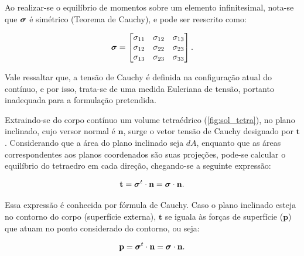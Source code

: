 Ao realizar-se o equilíbrio de momentos sobre um elemento infinitesimal, nota-se que $\bm{\sigma}$ é simétrico (Teorema de Cauchy), e pode ser reescrito como:

\begin{align}
	\bm{\sigma} =
	\begin{bmatrix}
		\sigma_{11} & \sigma_{12} & \sigma_{13} \\
		\sigma_{12} & \sigma_{22} & \sigma_{23} \\
		\sigma_{13} & \sigma_{23} & \sigma_{33}
	\end{bmatrix}
	.
\end{align}

Vale ressaltar que, a tensão de Cauchy é definida na configuração atual do contínuo, e por isso, trata-se de uma medida Euleriana de tensão, portanto inadequada para a formulação pretendida.

Extraindo-se do corpo contínuo um volume tetraédrico (\autoref{fig:sol_tetra}), no plano inclinado, cujo versor normal é $\mathbf{n}$, surge o vetor tensão de Cauchy designado por $\mathbf{t}$. Considerando que a área do plano inclinado seja $dA$, enquanto que as áreas correspondentes aos planos coordenados são suas projeções, pode-se calcular o equilíbrio do tetraedro em cada direção, chegando-se a seguinte expressão:

\begin{align}
	\mathbf{t} = \bm{\sigma}^{t} \cdot \mathbf{n} =  \bm{\sigma} \cdot \mathbf{n}.
\end{align}

Essa expressão é conhecida por fórmula de Cauchy. Caso o plano inclinado esteja no contorno do corpo (superfície externa), $\mathbf{t}$ se iguala às forças de superfície ($\mathbf{p}$) que atuam no ponto considerado do contorno, ou seja:

\begin{align}
	\mathbf{p} = \bm{\sigma}^{t} \cdot \mathbf{n} =  \bm{\sigma} \cdot \mathbf{n}.
\end{align}

